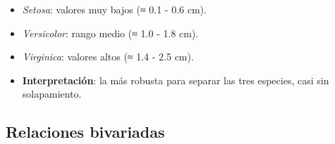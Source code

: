 \documentclass[
  spanish,
  11pt,
  a4paper,
  DIV=11,
  numbers=noendperiod]{scrartcl}
\providecommand{\tightlist}{%
  \setlength{\itemsep}{0pt}\setlength{\parskip}{0pt}}
\begin{document}
\begin{itemize}
  \begin{itemize}
  \tightlist
  \item
    \emph{Setosa}: valores muy bajos (≈ 0.1 - 0.6 cm).\\
  \item
    \emph{Versicolor}: rango medio (≈ 1.0 - 1.8 cm).\\
  \item
    \emph{Virginica}: valores altos (≈ 1.4 - 2.5 cm).\\
  \item
    \textbf{Interpretación}: la más robusta para separar las tres
    especies, casi sin solapamiento.
  \end{itemize}
\end{itemize}

\subsection{Relaciones bivariadas}\label{relaciones-bivariadas}
\end{document}
